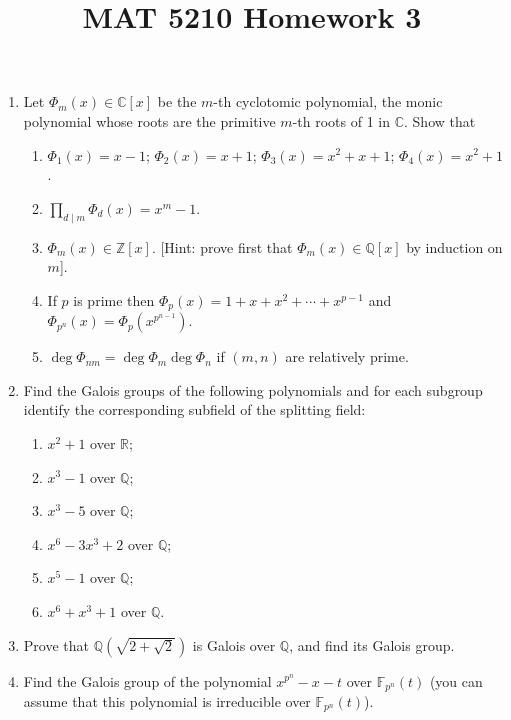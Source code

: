 \documentclass{article}
\title{MAT 5210 Homework 3}
\date{}
\begin{document}
\maketitle
\begin{enumerate}
    \item Let $\Phi_{m}(x) \in \mathbb{C}[x]$ be the $m$-th cyclotomic polynomial, the monic polynomial whose roots are the primitive $m$-th roots of 1 in $\mathbb{C}$. Show that
    \begin{enumerate}
        \item $\Phi_{1}(x) = x - 1$; $\Phi_{2}(x) = x + 1$; $\Phi_{3}(x) = x^2 + x + 1$; $\Phi_{4}(x) = x^2 + 1$.
        \item $\prod_{d \mid m} \Phi_{d}(x) = x^m - 1$.
        \item $\Phi_{m}(x) \in \mathbb{Z}[x]$. [Hint: prove first that $\Phi_{m}(x) \in \mathbb{Q}[x]$ by induction on $m$].
        \item If $p$ is prime then $\Phi_{p}(x) = 1 + x + x^2 + \cdots + x^{p-1}$ and $\Phi_{p^n}(x) = \Phi_{p}(x^{p^{n-1}})$.
        \item $\operatorname{deg} \Phi_{nm} = \operatorname{deg} \Phi_{m} \operatorname{deg} \Phi_{n}$ if $(m, n)$ are relatively prime.
    \end{enumerate}

    \item Find the Galois groups of the following polynomials and for each subgroup identify the corresponding subfield of the splitting field:
    \begin{enumerate}
        \item $x^2 + 1$ over $\mathbb{R}$;
        \item $x^3 - 1$ over $\mathbb{Q}$;
        \item $x^3 - 5$ over $\mathbb{Q}$;
        \item $x^6 - 3x^3 + 2$ over $\mathbb{Q}$;
        \item $x^5 - 1$ over $\mathbb{Q}$;
        \item $x^6 + x^3 + 1$ over $\mathbb{Q}$.
    \end{enumerate}

    \item Prove that $\mathbb{Q}(\sqrt{2 + \sqrt{2}})$ is Galois over $\mathbb{Q}$, and find its Galois group.

    \item Find the Galois group of the polynomial $x^{p^n} - x - t$ over $\mathbb{F}_{p^n}(t)$ (you can assume that this polynomial is irreducible over $\mathbb{F}_{p^n}(t)$).


\end{enumerate}
\end{document}
